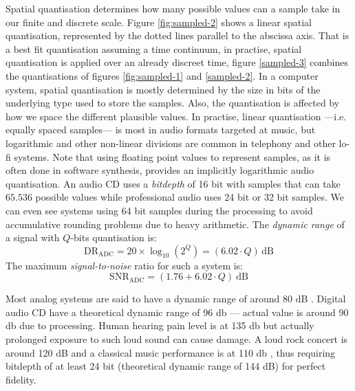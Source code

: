 Spatial quantisation determines how many possible values can a sample
take in our finite and discrete scale. Figure \ref{fig:sampled-2}
shows a linear spatial quantisation, represented by the dotted lines
parallel to the abscissa axis. That is a best fit quantisation
assuming a time continuum, in practise, spatial quantisation is
applied over an already discreet time, figure \ref{sampled-3} combines
the quantisations of figures \ref{fig:sampled-1} and
\ref{sampled-2}. In a computer system, spatial quantisation is mostly
determined by the size in bits of the underlying type used to store
the samples. Also, the quantisation is affected by how we space the
different plausible values. In practise, linear quantisation
---i.e. equally spaced samples--- is most in audio formats targeted at
music, but logarithmic and other non-linear divisions are common in
telephony and other lo-fi systems. Note that using floating point
values to represent samples, as it is often done in software
synthesis, provides an implicitly logarithmic audio quantisation. An
audio CD uses a \emph{bitdepth} of 16 bit with samples that can take
$65.536$ possible values while professional audio uses 24 bit or 32
bit samples. We can even see systems using 64 bit samples during the
processing to avoid accumulative rounding problems due to heavy
arithmetic. The \emph{dynamic range} of a signal with $Q$-bits
quantisation is:
\begin{equation}
  \mathrm{DR_{ADC}} = 20 \times \log_{10}(2^Q) = (6.02 \cdot Q)\, \mathrm{dB}
\end{equation}
The maximum \emph{signal-to-noise} ratio for such a system is:
\begin{equation}
  \mathrm{SNR_{ADC}} =  \left (1.76 + 6.02 \cdot Q \right )\ \mathrm{dB}
\end{equation}

Most analog systems are said to have a dynamic range of around 80 dB
\cite{fries05digital}. Digital audio CD have a theoretical
dynamic range of 96 db --- actual value is around 90 db due to
processing. Human hearing pain level is at 135 db but actually
prolonged exposure to such loud sound can cause damage. A loud rock
concert is around 120 dB and a classical music performance is at
110 db \cite{ludwig09music}, thus requiring bitdepth of at least 24
bit (theoretical dynamic range of 144 dB) for perfect fidelity.

